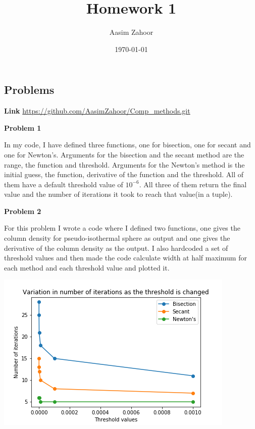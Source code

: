 \documentclass{article}
\title{Homework 1}
\author{Aasim Zahoor}
\date\today
\begin{document}
\maketitle %

\begin{center}
\section{Problems}
\end{center}
\textbf{Link}\vspace{1.5em}
\url{https://github.com/AasimZahoor/Comp_methods.git}
\vspace{1.5em}

\textbf{Problem 1}\vspace{1.5em}

In my code, I have defined three functions, one for bisection, one for secant and one for Newton's. Arguments for the bisection and the secant method are the range, the function and threshold. Arguments for the  Newton's method is the initial guess, the function, derivative of the function and the threshold.  All of them have a default threshold value of $10^{-6}$. All three of them return the final value and the number of iterations it took to reach that value(in a tuple).

\vspace{1.5em}
\textbf{Problem 2}\vspace{1.5em}

For this problem I wrote a code where I defined two functions, one gives the column density for pseudo-isothermal sphere as output and one gives the derivative of the column density as the output. I also hardcoded a set of threshold values and then made the code calculate width at half maximum for each method and each threshold value and plotted it.
\vspace{1.5em}
\begin{center}
 \includegraphics[scale=0.3]{Images/HW1_pb2}
 \end{center}
 
\end{document}
